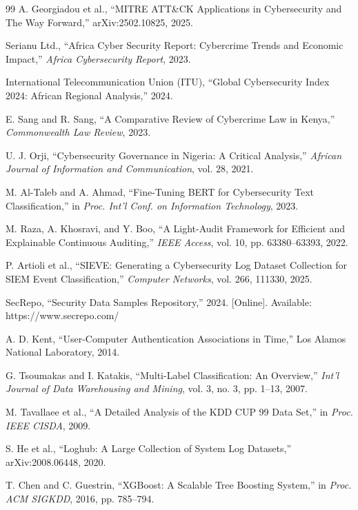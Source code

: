 \documentclass[11pt,conference]{IEEEtran}
\begin{document}
\begin{thebibliography}{99}
A. Georgiadou et al., ``MITRE ATT\&CK Applications in Cybersecurity and The Way Forward,'' arXiv:2502.10825, 2025.

Serianu Ltd., ``Africa Cyber Security Report: Cybercrime Trends and Economic Impact,'' \textit{Africa Cybersecurity Report}, 2023.

International Telecommunication Union (ITU), ``Global Cybersecurity Index 2024: African Regional Analysis,'' 2024.

E. Sang and R. Sang, ``A Comparative Review of Cybercrime Law in Kenya,'' \textit{Commonwealth Law Review}, 2023.

U. J. Orji, ``Cybersecurity Governance in Nigeria: A Critical Analysis,'' \textit{African Journal of Information and Communication}, vol. 28, 2021.

M. Al-Taleb and A. Ahmad, ``Fine-Tuning BERT for Cybersecurity Text Classification,'' in \textit{Proc. Int'l Conf. on Information Technology}, 2023.

M. Raza, A. Khosravi, and Y. Boo, ``A Light-Audit Framework for Efficient and Explainable Continuous Auditing,'' \textit{IEEE Access}, vol. 10, pp. 63380--63393, 2022.

P. Artioli et al., ``SIEVE: Generating a Cybersecurity Log Dataset Collection for SIEM Event Classification,'' \textit{Computer Networks}, vol. 266, 111330, 2025.

SecRepo, ``Security Data Samples Repository,'' 2024. [Online]. Available: https://www.secrepo.com/

A. D. Kent, ``User-Computer Authentication Associations in Time,'' Los Alamos National Laboratory, 2014.

G. Tsoumakas and I. Katakis, ``Multi-Label Classification: An Overview,'' \textit{Int'l Journal of Data Warehousing and Mining}, vol. 3, no. 3, pp. 1--13, 2007.

M. Tavallaee et al., ``A Detailed Analysis of the KDD CUP 99 Data Set,'' in \textit{Proc. IEEE CISDA}, 2009.

S. He et al., ``Loghub: A Large Collection of System Log Datasets,'' arXiv:2008.06448, 2020.

T. Chen and C. Guestrin, ``XGBoost: A Scalable Tree Boosting System,'' in \textit{Proc. ACM SIGKDD}, 2016, pp. 785--794.


\end{thebibliography}
\end{document}

